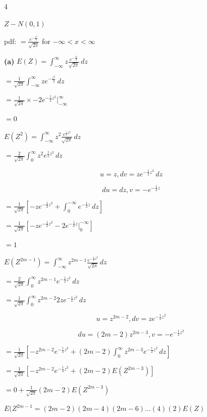 \documentclass[12 pt]{article}
\begin{document}
    \begin{exercise}{4}
    \hfill

    $Z - N(0,1)$

    pdf: $= \frac{e^{- \frac{x^2}{2}}}{\sqrt{2 \pi}}$ for $-\infty < x < \infty$

    \textbf{(a)}
    $E(Z) = \int_{-\infty}^{\infty} z \frac{e^{-\frac{z^2}{2}}}{\sqrt{2 \pi}} \, dz$

    $= \frac{1}{\sqrt{2 \pi}} \int_{-\infty}^{\infty} z e^{-\frac{z^2}{2}} \, dz$

    $= \frac{1}{\sqrt{2 \pi}} \times -2 e^{- \frac{1}{2}z^2} |_{-\infty}^{\infty}$

    $= 0$

    \hfill

    $E(Z^2) = \int_{-\infty}^{\infty} z^2 \frac{e^{\frac{1}{2}z^2}}{\sqrt{2 \pi}} \, dz$

    $= \frac{2}{\sqrt{2 \pi}} \int_{0}^{\infty} z^2 e^{\frac{1}{2}z^2} \, dz$

    $$u = z, dv = ze^{- \frac{1}{2}z^2} \, dz$$

    $$du = dz, v= -e^{- \frac{1}{2}z}$$

    $= \frac{1}{\sqrt{2 \pi}} [-ze^{-\frac{1}{2}z^2} + \int_{0}^{- \infty} e^{-\frac{1}{2}z} \, dz]$

    $= \frac{1}{\sqrt{2 \pi}} [-ze^{-\frac{1}{2}z^2} - 2e^{- \frac{1}{2}z} |_{0}^{-\infty}]$

    $= 1$

    \hfill

    $E(Z^{2m-1}) = \int_{-\infty}^{\infty} z^{2m-1} \frac{e^{-\frac{1}{2} z^2}}{\sqrt{2 \pi}} \, dz$

    $= \frac{2}{\sqrt{2 \pi}} \int_{0}^{\infty} z^{2m-1} e^{-\frac{1}{2} z^2} \, dz$

    $= \frac{1}{\sqrt{2 \pi}} \int_{0}^{\infty} z^{2m-2} 2z e^{-\frac{1}{2}z^2} \, dz$

    $$u = z^{2m-2}, dv = ze^{-\frac{1}{2}z^2}$$

    $$du = (2m-2)z^{2m-3}, v= -e^{-{\frac{1}{2}z^2}}$$

    $= \frac{1}{\sqrt{2 \pi}} [-z^{2m-2} e^{-\frac{1}{2}z^2} + (2m-2) \int_{0}^{\infty} z^{2m-3}e^{- \frac{1}{2}z^2} \, dz]$

    $= \frac{1}{\sqrt{2 \pi}} [-z^{2m-2} e^{-\frac{1}{2}z^2} + (2m-2) E(Z^{2m-3})]$

    $= 0 + \frac{1}{\sqrt{2 \pi}}(2m-2) E(Z^{2m-3})$

    $E(Z^{2m-1} = (2m-2)(2m-4)(2m-6)...(4)(2)E(Z)$


\end{exercise}
\end{document}
